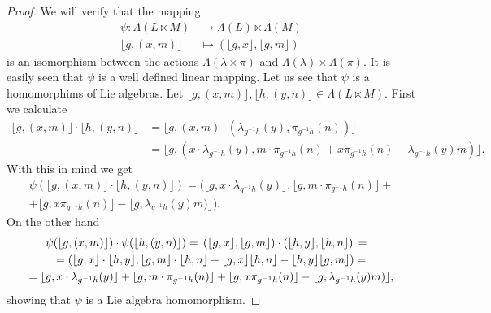 \documentclass[11pt]{amsart}
\numberwithin{equation}{section}
\theoremstyle{definition}
\theoremstyle{remark}
\begin{document}
\begin{proof}
    We will verify that the mapping 
    \begin{align*}
        \psi: \Lambda(L\ltimes M) &\to \Lambda(L)\ltimes\Lambda(M)\\
        \lfloor g,(x,m)\rfloor &\mapsto (\lfloor g,x\rfloor, \lfloor g,m\rfloor)
    \end{align*}
    is an isomorphism between the actions $\Lambda(\lambda\times \pi)$ and $\Lambda(\lambda)\times \Lambda(\pi)$.  It is easily seen that $\psi $ is a well defined linear mapping. Let us see that $\psi$ is a homomorphims of Lie algebras. Let $\lfloor g,(x,m)\rfloor, \lfloor h,(y,n)\rfloor \in \Lambda(L\ltimes M)$. First we calculate 
    \begin{align*}
        \lfloor g,(x,m)\rfloor\cdot\lfloor h,(y,n)\rfloor &=\lfloor g,(x,m)\cdot(\lambda_{g^{-1}h}(y),\pi_{g^{-1}h}(n))\rfloor\\ &=\lfloor g,(x\cdot \lambda_{g^{-1}h}(y), m\cdot\pi_{g^{-1}h}(n)+x\pi_{g^{-1}h}(n)- \lambda_{g^{-1}h}(y)m)\rfloor.
    \end{align*} 
    With this in mind we get
\begin{multline*}
 \psi(\lfloor g,(x,m)\rfloor\cdot\lfloor h,(y,n)\rfloor )=(\lfloor g,x\cdot \lambda_{g^{-1}h}(y)\rfloor, \lfloor g, m\cdot\pi_{g^{-1}h}(n)\rfloor +\\ +\lfloor g, x\pi_{g^{-1}h}(n)\rfloor- \lfloor g,\lambda_{g^{-1}h}(y)m)\rfloor).
\end{multline*}    
    On the other hand
\begin{multline*}
\hspace{-0.3cm}
 \psi(\lfloor g,(x,m)\rfloor) \cdot \psi (\lfloor h,(y,n)\rfloor )=\, (\lfloor g,x\rfloor, \lfloor g,m\rfloor)\cdot (\lfloor h,y\rfloor, \lfloor h,n\rfloor)\,=\\=  (\lfloor g,x\rfloor\cdot \lfloor h,y\rfloor, \lfloor g,m\rfloor\cdot \lfloor h,n\rfloor +\lfloor g,x\rfloor\lfloor h,n\rfloor - \lfloor h,y\rfloor \lfloor g,m\rfloor)=\\=\lfloor g,x\cdot \lambda_{g^{-1}h}(y)\rfloor +\lfloor g, m\cdot\pi_{g^{-1}h}(n)\rfloor+\lfloor g, x\pi_{g^{-1}h}(n)\rfloor-\lfloor g,\lambda_{g^{-1}h}(y)m)\rfloor,
\end{multline*}    
showing that $\psi$ is a Lie algebra homomorphism. 


\end{proof}
\end{document}
